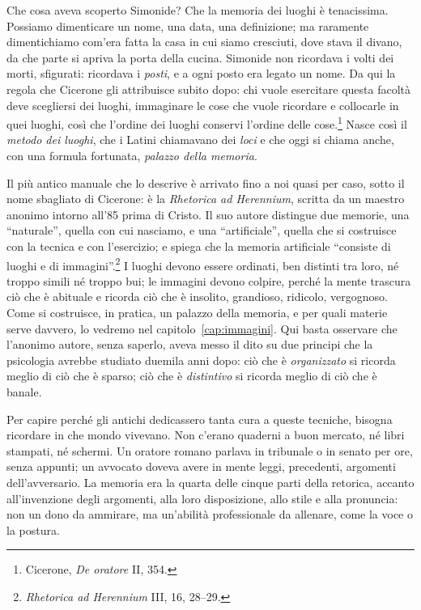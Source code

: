 Che cosa aveva scoperto Simonide? Che la memoria dei luoghi è
tenacissima. Possiamo dimenticare un nome, una data, una definizione;
ma raramente dimentichiamo com'era fatta la casa in cui siamo cresciuti,
dove stava il divano, da che parte si apriva la porta della cucina.
Simonide non ricordava i volti dei morti, sfigurati: ricordava i
\emph{posti}, e a ogni posto era legato un nome. Da qui la regola che
Cicerone gli attribuisce subito dopo: chi vuole esercitare questa
facoltà deve scegliersi dei luoghi, immaginare le cose che vuole
ricordare e collocarle in quei luoghi, così che l'ordine dei luoghi
conservi l'ordine delle cose.\footnote{Cicerone, \emph{De oratore}
II, 354.} Nasce così il \emph{metodo dei luoghi}, che i Latini
chiamavano dei \emph{loci} e che oggi si chiama anche, con una formula
fortunata, \emph{palazzo della memoria}.

Il più antico manuale che lo descrive è arrivato fino a noi quasi per
caso, sotto il nome sbagliato di Cicerone: è la \emph{Rhetorica ad
Herennium}, scritta da un maestro anonimo intorno all'85 prima di
Cristo. Il suo autore distingue due memorie, una \enquote{naturale},
quella con cui nasciamo, e una \enquote{artificiale}, quella che si
costruisce con la tecnica e con l'esercizio; e spiega che la memoria
artificiale \enquote{consiste di luoghi e di
immagini}.\footnote{\emph{Rhetorica ad Herennium} III, 16, 28--29.} I
luoghi devono essere ordinati, ben distinti tra loro, né troppo simili
né troppo bui; le immagini devono colpire, perché la mente trascura ciò
che è abituale e ricorda ciò che è insolito, grandioso, ridicolo,
vergognoso. Come si costruisce, in pratica, un palazzo della memoria, e
per quali materie serve davvero, lo vedremo nel
capitolo~\ref{cap:immagini}. Qui basta osservare che l'anonimo autore,
senza saperlo, aveva messo il dito su due principi che la psicologia
avrebbe studiato duemila anni dopo: ciò che è \emph{organizzato} si
ricorda meglio di ciò che è sparso; ciò che è \emph{distintivo} si
ricorda meglio di ciò che è banale.

Per capire perché gli antichi dedicassero tanta cura a queste tecniche,
bisogna ricordare in che mondo vivevano. Non c'erano quaderni a buon
mercato, né libri stampati, né schermi. Un oratore romano parlava in
tribunale o in senato per ore, senza appunti; un avvocato doveva avere
in mente leggi, precedenti, argomenti dell'avversario. La memoria era la
quarta delle cinque parti della retorica, accanto all'invenzione degli
argomenti, alla loro disposizione, allo stile e alla pronuncia: non un
dono da ammirare, ma un'abilità professionale da allenare, come la voce
o la postura.

